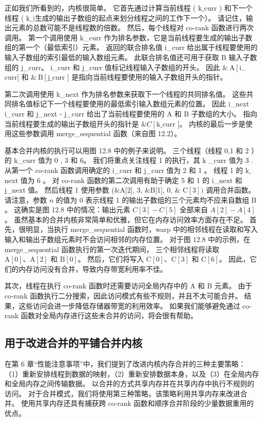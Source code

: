 正如我们所看到的，内核很简单。 它首先通过计算当前线程 ( $\mathrm{k} \_$curr ) 和下一个线程 ( $\mathrm{k} \_ ) 生成的输出子数组的起点来划分线程之间的工作 $下一个）。 
请记住，输出元素的总数可能不是线程数的倍数。 然后，每个线程对 co-rank 函数进行两次调用。 
第一个调用使用 k\_curr 作为排名参数，它是当前线程要生成的输出子数组的第一个（最低索引）元素。 
返回的联合排名值 i\_curr 给出属于线程要使用的输入子数组的索引最低的输入数组元素。 
此联合排名值还可用于获取 $\mathrm{B}$ 输入子数组的 j\_curr。 i\_curr 和 j\_curr 值标记线程输入子数组的开头。 
因此 $\& \mathrm{~A}\left[\mathrm{i}_{-}\right.$curr] 和 $\& \mathrm{~B}\left[\mathrm{j} \_\right .$curr $]$ 是指向当前线程要使用的输入子数组开头的指针。

第二次调用使用 k\_next 作为排名参数来获取下一个线程的共同排名值。 
这些共同排名值标记下一个线程要使用的最低索引输入数组元素的位置。 
因此 i\_next i\_curr 和 j\_next - j\_curr 给出了当前线程要使用的 A 和 B 子数组的大小。 
指向当前线程要生成的输出子数组开头的指针是 $\& C\left[\mathrm{k} \_\right.$curr $]$。 
内核的最后一步是使用这些参数调用 merge\_sequential 函数（来自图 12.2）。

基本合并内核的执行可以用图 12.8 中的例子来说明。 三个线程（线程 0,1 和 2 ）的 k\_curr 值为 0 , 3 和 6。
我们将重点关注线程 1 的执行，其 $\mathrm{k}$ \_curr 值为 3 . 
从第一个 co-rank 函数调用确定的 i\_curr 和 j\_curr 值为 2 和 1 。 
线程 1 的 $\mathrm{k} \_$next 值为 6 。 
对 co-rank 函数的第二次调用有助于确定 5 和 1 的 i\_next 和 j\_next 值。 
然后线程 1 使用参数 (\&A[2], 3, \&B[1], 0, \& $\mathrm{C}[3])$ 调用合并函数。 
请注意，参数 $n$ 的值为 0 表示线程 1 的输出子数组的三个元素均不应来自数组 $\mathrm{B}$。 
这确实是图 12.8 中的情况：输出元素 $C[3]-C[5]$ 全部来自 $A[2]-A[4]$。 
虽然基本的合并内核非常简单和优雅，但它在内存访问效率方面存在不足。 
首先，很明显，当执行 merge\_sequential 函数时，warp 中的相邻线程在读取和写入输入和输出子数组元素时不会访问相邻的内存位置。 
对于图 12.8 中的示例，在 merge\_sequential 函数执行的第一次迭代期间，
三个相邻线程将读取 $\mathrm{A}[0]、\mathrm{A}[2]$ 和 $\mathrm {B}[0]$。 
然后，它们将写入 $\mathrm{C}[0]、\mathrm{C}[3]$ 和 $\mathrm{C}[6]$。 
因此，它们的内存访问没有合并，导致内存带宽利用率不佳。

其次，线程在执行 co-rank 函数时还需要访问全局内存中的 A 和 B 元素。 
由于 co-rank 函数执行二分搜索，因此访问模式有些不规则，并且不太可能合并。 
结果，这些访问会进一步降低存储器带宽的利用效率。 
如果我们能够避免通过 co-rank 函数对全局内存进行这些未合并的访问，将会很有帮助。

\subsection{用于改进合并的平铺合并内核}
在第 6 章“性能注意事项”中，我们提到了改进内核内存合并的三种主要策略：
（1）重新安排线程到数据的映射，（2）重新安排数据本身，以及（3）在全局内存和全局内存之间传输数据。 
以合并的方式共享内存并在共享内存中执行不规则的访问。 对于合并模式，我们将使用第三种策略，该策略利用共享内存来改进合并。 
使用共享内存还具有捕获跨 co-rank 函数和顺序合并阶段的少量数据重用的优点。

